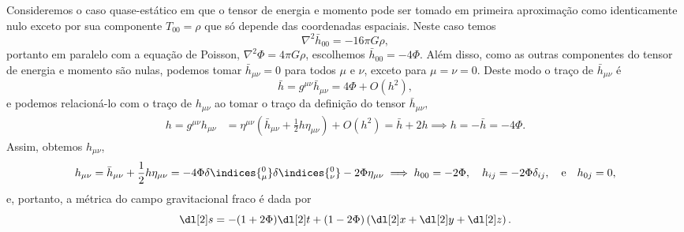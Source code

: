 Consideremos o caso quase-estático em que o tensor de energia e momento pode ser tomado em primeira aproximação como identicamente nulo exceto por sua componente \(T_{00} = \rho\) que só depende das coordenadas espaciais. Neste caso temos
\begin{equation*}
    \nabla^2 \bar{h}_{00} = -16 \pi G \rho,
\end{equation*}
portanto em paralelo com a equação de Poisson, \(\nabla^2\Phi = 4\pi G \rho\), escolhemos \(\bar{h}_{00} = -4\Phi\). Além disso, como as outras componentes do tensor de energia e momento são nulas, podemos tomar \(\bar{h}_{\mu\nu} = 0\) para todos \(\mu\) e \(\nu\), exceto para \(\mu = \nu = 0\). Deste modo o traço de \(\bar{h}_{\mu\nu}\) é
\begin{equation*}
    \bar{h} = g^{\mu\nu}\bar{h}_{\mu\nu} = 4\Phi + O(h^2),
\end{equation*}
e podemos relacioná-lo com o traço de \(h_{\mu\nu}\) ao tomar o traço da definição do tensor \(\bar{h}_{\mu\nu},\)
\begin{align*}
    h = g^{\mu\nu}h_{\mu\nu} &= \eta^{\mu\nu}\left(\bar{h}_{\mu\nu} + \frac12 h\eta_{\mu\nu}\right) + O(h^2) = \bar{h} + 2h \implies h = -\bar{h} = -4\Phi.
\end{align*}
Assim, obtemos \(h_{\mu\nu}\),
\begin{equation*}
    h_{\mu\nu} = \bar{h}_{\mu\nu} + \frac12 h \eta_{\mu\nu} = -4\Phi \delta\indices{^0_\mu}\delta\indices{^0_\nu} - 2 \Phi \eta_{\mu\nu} \implies h_{00} = -2\Phi,\quad h_{ij} = -2 \Phi \delta_{ij},\quad\text{e}\quad h_{0j} = 0 ,
\end{equation*}
e, portanto, a métrica do campo gravitacional fraco é dada por
\begin{equation*}
    \dl[2]s = -(1 + 2 \Phi)\dl[2]t + (1 - 2 \Phi)\left(\dl[2]x + \dl[2]y + \dl[2]z\right).
\end{equation*}
